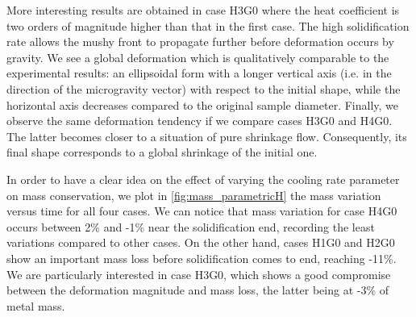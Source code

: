 More interesting results are obtained in case H3G0 where the heat coefficient is two orders of magnitude 
higher than that in the first case. The high solidification rate allows the mushy front 
to propagate further before deformation occurs by gravity. We see a global deformation which is qualitatively comparable to the experimental 
results: an ellipsoidal form with a longer vertical axis (i.e. in the direction of the microgravity vector) 
with respect to the initial shape, while the horizontal axis decreases compared to the original
sample diameter. Finally, we observe the same deformation tendency if we compare cases H3G0 and H4G0. 
The latter becomes closer to a situation of pure shrinkage flow. Consequently, its final shape corresponds to a global shrinkage of the initial one.

In order to have a clear idea on the effect of varying the cooling rate parameter on mass conservation, we plot in \cref{fig:mass_parametricH}
the mass variation versus time for all four cases. We can notice that mass variation for case H4G0 occurs between 2\% and -1\% near the solidification end,
recording the least variations compared to other cases. On the other hand, cases H1G0 and H2G0 show an important mass loss before solidification comes to end,
reaching -11\%. We are particularly interested in case H3G0, which shows a good compromise between the deformation magnitude and mass loss, the latter being at -3\% of metal mass.

